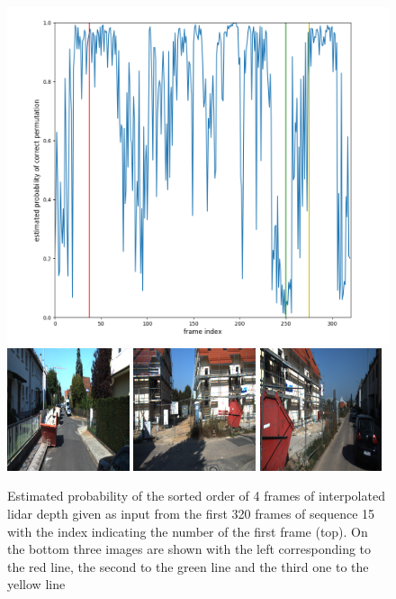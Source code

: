 \begin{figure}[t!]
\centering
\includegraphics[width=\textwidth]{images/percentages_small.png}
\includegraphics[width=0.32\textwidth]{images/000037.png}
\includegraphics[width=0.32\textwidth]{images/000250.png}
\includegraphics[width=0.32\textwidth]{images/000275.png}
\caption{Estimated probability of the sorted order of 4 frames of interpolated lidar depth given as input from the first 320 frames of sequence 15 with the index indicating the number of the first frame (top). On the bottom three images are shown with the left corresponding to the red line, the second to the green line and the third one to the yellow line}
\label{fig:percentages}
\end{figure}

